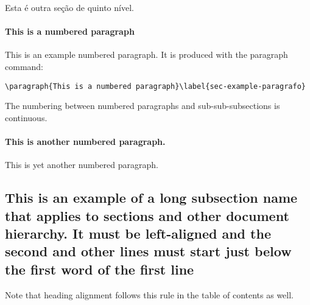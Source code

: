 \label{sec-example-subsubsubsection-outro}

Esta é outra seção de quinto nível.


\paragraph{This is a numbered paragraph}\label{sec-example-paragrafo}

This is an example numbered paragraph. It is produced with the paragraph command:

\begin{verbatim}
\paragraph{This is a numbered paragraph}\label{sec-example-paragrafo}
\end{verbatim}

The numbering between numbered paragraphs and sub-sub-subsections is continuous.

\paragraph{This is another numbered paragraph.}\label{sec-example-paragrafo-outro}

This is yet another numbered paragraph.

\subsection{This is an example of a long subsection name that applies to sections and other document hierarchy. It must be left-aligned and the second and other lines must start just below the first word of the first line} 

Note that heading alignment follows this rule in the table of contents as well.	






